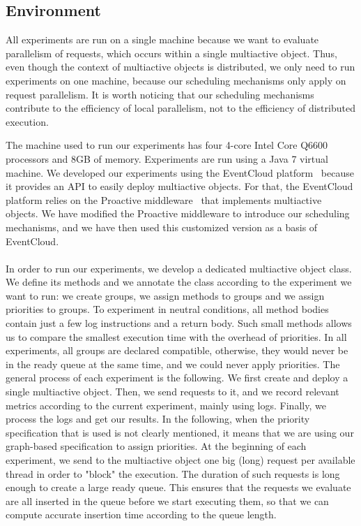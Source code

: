 \documentclass[11pt]{report}
\begin{document}
\subsection{Environment}
All experiments are run on a single machine because we want to evaluate parallelism of requests, which occurs within a single multiactive object. Thus, even though the context of multiactive objects is distributed, we only need to run experiments on one machine, because our scheduling mechanisms only apply on request parallelism. It is worth noticing that our scheduling mechanisms contribute to the efficiency of local parallelism, not to the efficiency of distributed execution.

The machine used to run our experiments has four 4-core Intel Core Q6600 processors and 8GB of memory. Experiments are run using a Java 7 virtual machine.
We developed our experiments using the EventCloud platform~\cite{ref:eventcloud} because it provides an API to easily deploy multiactive objects. For that, the EventCloud platform relies on the Proactive middleware~\cite{ref:proactive} that implements multiactive objects. We have modified the Proactive middleware to introduce our scheduling mechanisms, and we have then used this customized version as a basis of EventCloud.

\paragraph{}
In order to run our experiments, we develop a dedicated multiactive object class. We define its methods and we annotate the class according to the experiment we want to run: we create groups, we assign methods to groups and we assign priorities to groups. To experiment in neutral conditions, all method bodies contain just a few log instructions and a return body. Such small methods allows us to compare the smallest execution time with the overhead of priorities. 
In all experiments, all groups are declared compatible, otherwise, they would never be in the ready queue at the same time, and we could never apply priorities. The general process of each experiment is the following. We first create and deploy a single multiactive object. Then, we send requests to it, and we record relevant metrics according to the current experiment, mainly using logs. Finally, we process the logs and get our results.
In the following, when the priority specification that is used is not clearly mentioned, it means that we are using our graph-based specification to assign priorities. At the beginning of each experiment, we send to the multiactive object one big (long) request per available thread in order to "block" the execution. The duration of such requests is long enough to create a large ready queue. This ensures that the requests we evaluate are all inserted in the queue before we start executing them, so that we can compute accurate insertion time according to the queue length.
\end{document}
